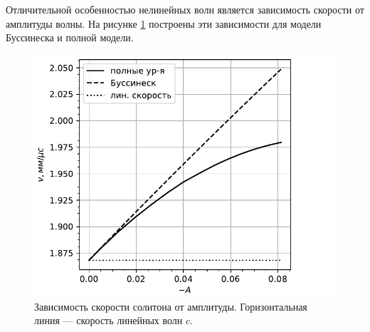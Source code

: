 \documentclass[12pt, a4paper]{article}
\begin{document}
Отличительной особенностью нелинейных волн является зависимость скорости от амплитуды волны. На рисунке \ref{fig:sol_compare} построены эти зависимости для модели Буссинеска и полной модели.
\begin{figure}[h]
	\centering
	\includegraphics[width=0.5\linewidth]{figures/VelAmpl}
	\caption{Зависимость скорости солитона от амплитуды. Горизонтальная линия --- скорость линейных волн $c$.}
	\label{fig:sol_compare}
\end{figure}


\end{document}
